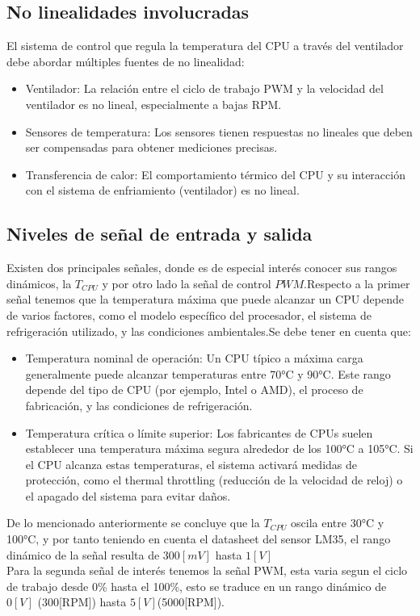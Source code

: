 \documentclass[12pt]{article}
\begin{document}
	\subsection{No linealidades involucradas}
	El sistema de control que regula la temperatura del CPU a través del ventilador debe abordar múltiples fuentes de no linealidad:
	\begin{itemize}
		\item Ventilador: La relación entre el ciclo de trabajo PWM y la velocidad del ventilador es no lineal, especialmente a bajas RPM.
		\item Sensores de temperatura: Los sensores tienen respuestas no lineales que deben ser compensadas para obtener mediciones precisas.
		\item Transferencia de calor: El comportamiento térmico del CPU y su interacción con el sistema de enfriamiento (ventilador) es no lineal.
	\end{itemize}
	
	\subsection{Niveles de señal de entrada y salida}
	Existen dos principales señales, donde es de especial interés conocer sus rangos dinámicos, la  $T_{CPU}$ y por otro lado la señal de control $PWM$.Respecto a la primer señal tenemos que la temperatura máxima que puede alcanzar un CPU depende de varios factores, como el modelo específico del procesador, el sistema de refrigeración utilizado, y las condiciones ambientales.Se debe tener en cuenta que:
	\begin{itemize}
		\item Temperatura nominal de operación: Un CPU típico a máxima carga generalmente puede alcanzar temperaturas entre 70°C y 90°C. Este rango depende del tipo de CPU (por ejemplo, Intel o AMD), el proceso de fabricación, y las condiciones de refrigeración.
		\item Temperatura crítica o límite superior: Los fabricantes de CPUs suelen establecer una temperatura máxima segura alrededor de los 100°C a 105°C. Si el CPU alcanza estas temperaturas, el sistema activará medidas de protección, como el thermal throttling (reducción de la velocidad de reloj) o el apagado del sistema para evitar daños.
	\end{itemize}
	
	De lo mencionado anteriormente se concluye que la $T_{CPU}$ oscila entre 30°C  y 100°C, y por tanto teniendo en cuenta el datasheet del sensor LM35, el rango dinámico de la señal resulta de $300[mV]$ hasta $1[V]$ \\
	Para la segunda señal de interés tenemos la señal PWM, esta varia segun el ciclo de trabajo desde 0\% hasta el 100\%, esto se traduce en un rango dinámico de $0[V]$ (300[RPM]) hasta $5[V]$(5000[RPM]).
	 
\end{document}
